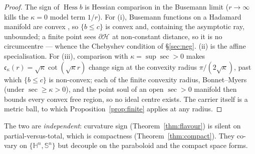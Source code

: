 \documentclass[11pt]{article}
\theoremstyle{remark}
\newcommand{\Hb}[1]{\mathcal{H}_{#1}}
\newcommand{\sect}{\operatorname{sec}}
\newcommand{\Hess}{\operatorname{Hess}}
\newcommand{\HH}{\mathbb{H}}
\newcommand{\Sn}{\mathbb{S}^{n}}
\begin{document}
\begin{proof}
The sign of $\Hess b$ is Hessian comparison in the Busemann limit
($r\to\infty$ kills the $\kappa=0$ model term $1/r$). For (i), Busemann
functions on a Hadamard manifold are convex \cite[II.8.24]{BH}, so
$\{b\le c\}$ is convex and, containing the asymptotic ray, unbounded; a
finite point sees $\partial\Hb{}$ at non-constant distance, so it is no
circumcentre --- whence the Chebyshev condition of \S\ref{sec:neg}. (ii) is
the affine specialisation. For (iii), comparison with $\kappa=\sup\sect>0$
makes $\mathfrak{c}_{\kappa}(r)=\sqrt\kappa\cot(\sqrt\kappa r)$ change sign
at the convexity radius $\pi/(2\sqrt\kappa)$, past which $\{b\le c\}$ is
non-convex; each of the finite convexity radius, Bonnet--Myers (under
$\sect\ge\kappa>0$), and the point soul of an open $\sect>0$ manifold
\cite{CG,Per} then bounds every convex free region, so no ideal centre
exists. The carrier itself is a metric ball, to which
Proposition~\ref{prop:finite} applies at any radius.
\end{proof}

\noindent The two are \emph{independent}: curvature sign
(Theorem~\ref{thm:flavour}) is silent on partial-versus-total, which is
compactness (Theorem~\ref{thm:compact}). They co-vary on $\{\HH^{n},\Sn\}$
but decouple on the paraboloid and the compact space forms.
\end{document}
